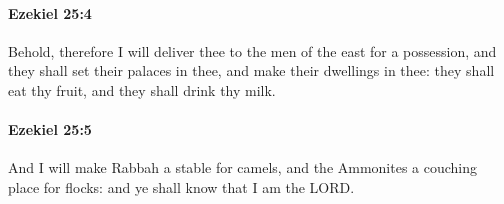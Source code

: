		\paragraph{Ezekiel 25:4} %
			\label{EZEKIEL-25-4}

			Behold, therefore I will deliver thee to the men of the east for a possession, and they shall set their palaces in thee, and make their dwellings in thee: they shall eat thy fruit, and they shall drink thy milk.


		\paragraph{Ezekiel 25:5} %
			\label{EZEKIEL-25-5}

			And I will make Rabbah a stable for camels, and the Ammonites a couching place for flocks: and ye shall know that I am the LORD.


